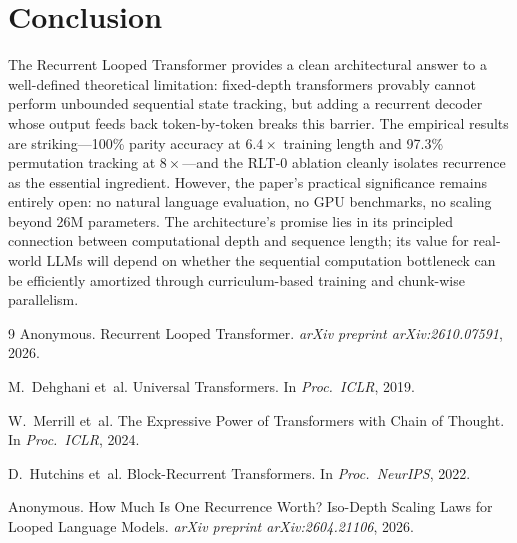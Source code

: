 \documentclass[11pt,a4paper]{article}
\begin{document}
\section{Conclusion}
The Recurrent Looped Transformer provides a clean architectural answer to a well-defined theoretical limitation: fixed-depth transformers provably cannot perform unbounded sequential state tracking, but adding a recurrent decoder whose output feeds back token-by-token breaks this barrier. The empirical results are striking---100\% parity accuracy at $6.4\times$ training length and 97.3\% permutation tracking at $8\times$---and the RLT-0 ablation cleanly isolates recurrence as the essential ingredient. However, the paper's practical significance remains entirely open: no natural language evaluation, no GPU benchmarks, no scaling beyond 26M parameters. The architecture's promise lies in its principled connection between computational depth and sequence length; its value for real-world LLMs will depend on whether the sequential computation bottleneck can be efficiently amortized through curriculum-based training and chunk-wise parallelism.

\begin{thebibliography}{9}
Anonymous.
\newblock Recurrent Looped Transformer.
\newblock \emph{arXiv preprint arXiv:2610.07591}, 2026.

M.~Dehghani et~al.
\newblock Universal Transformers.
\newblock In \emph{Proc.\ ICLR}, 2019.

W.~Merrill et~al.
\newblock The Expressive Power of Transformers with Chain of Thought.
\newblock In \emph{Proc.\ ICLR}, 2024.

D.~Hutchins et~al.
\newblock Block-Recurrent Transformers.
\newblock In \emph{Proc.\ NeurIPS}, 2022.

Anonymous.
\newblock How Much Is One Recurrence Worth? Iso-Depth Scaling Laws for Looped Language Models.
\newblock \emph{arXiv preprint arXiv:2604.21106}, 2026.
\end{thebibliography}
\end{document}
